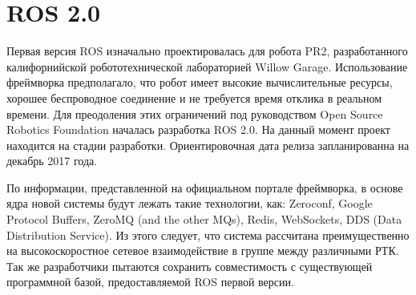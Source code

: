 \section{ROS 2.0}

Первая версия ROS изначально проектировалась для робота PR2, 
разработанного калифорнийской робототехнической лабораторией 
Willow Garage. Использование фреймворка предполагало, что робот 
имеет высокие вычислительные ресурсы, хорошее беспроводное 
соединение и не требуется время отклика в реальном времени. Для 
преодоления этих ограничений под руководством Open Source 
Robotics Foundation началась разработка ROS 2.0. На данный 
момент проект находится на стадии разработки. Ориентировочная 
дата релиза запланированна на декабрь 2017 года.

По информации, представленной на официальном портале фреймворка, 
в основе ядра новой системы будут лежать такие технологии, как: 
Zeroconf, Google Protocol Buffers, ZeroMQ (and the other MQs), 
Redis, WebSockets, DDS (Data Distribution Service). Из этого 
следует, что система рассчитана преимущественно на 
высокоскоростное сетевое взаимодействие в группе между 
различными РТК. Так же разработчики пытаются сохранить 
совместимость с существующей программной базой, предоставляемой 
ROS первой версии.